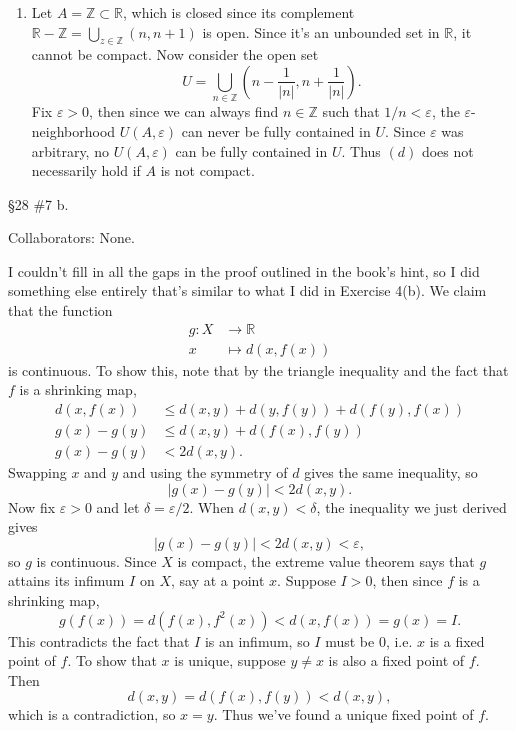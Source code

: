 \documentclass[10pt]{report}
\begin{document}
\begin{enumerate}
	\item Let $A = \mathbb{Z} \subset \mathbb{R}$, which is closed since its complement $\mathbb{R} - \mathbb{Z} = \bigcup_{z \in \mathbb{Z}}(n,n+1)$ is open. Since it's an unbounded set in $\mathbb{R}$, it cannot be compact. Now consider the open set
		\[
			U = \bigcup_{n \in \mathbb{Z}} \left( n-\frac{1}{|n|} ,n+\frac{1}{|n|}  \right).
		\] Fix $\varepsilon>0$, then since we can always find $n \in \mathbb{Z}$ such that $1/n < \varepsilon$, the $\varepsilon$-neighborhood $U(A,\varepsilon)$ can never be fully contained in $U$. Since $\varepsilon$ was arbitrary, no $U(A,\varepsilon)$ can be fully contained in $U$. Thus $(d)$ does not necessarily hold if $A$ is not compact.
\end{enumerate}

\begin{exer}[]
\S 28 \#7 b.
\end{exer}
{\color{blue}Collaborators: None.}

I couldn't fill in all the gaps in the proof outlined in the book's hint, so I did something else entirely that's similar to what I did in Exercise 4(b). We claim that the function
\begin{align*}
	g:X&\to \mathbb{R} \\
	x&\mapsto d(x,f(x))
\end{align*}
is continuous. To show this, note that by the triangle inequality and the fact that $f$ is a shrinking map,
\begin{align*}
	d(x,f(x)) &\leq d(x,y)+d(y,f(y))+d(f(y),f(x)) \\
	g(x)-g(y) &\leq d(x,y) + d(f(x),f(y)) \\
	g(x)-g(y) &< 2d(x,y).
\end{align*}
Swapping $x$ and $y$ and using the symmetry of $d$ gives the same inequality, so
\[
	|g(x)-g(y)| < 2d(x,y).
\]
Now fix $\varepsilon>0$ and let $\delta = \varepsilon/2$. When $d(x,y)<\delta$, the inequality we just derived gives
\[
	|g(x)-g(y)| < 2d(x,y) < \varepsilon,
\] so $g$ is continuous. Since $X$ is compact, the extreme value theorem says that $g$ attains its infimum $I$ on $X$, say at a point $x$. Suppose $I>0$, then since $f$ is a shrinking map,
\[
	g(f(x)) = d(f(x), f^2(x)) < d(x,f(x)) = g(x) = I.
\] This contradicts the fact that $I$ is an infimum, so $I$ must be 0, i.e. $x$ is a fixed point of $f$. To show that $x$ is unique, suppose $y \neq x$ is also a fixed point of $f$. Then
\[
	d(x,y) = d(f(x),f(y))< d(x,y),
\] which is a contradiction, so $x=y$. Thus we've found a unique fixed point of $f$.
\end{document}
